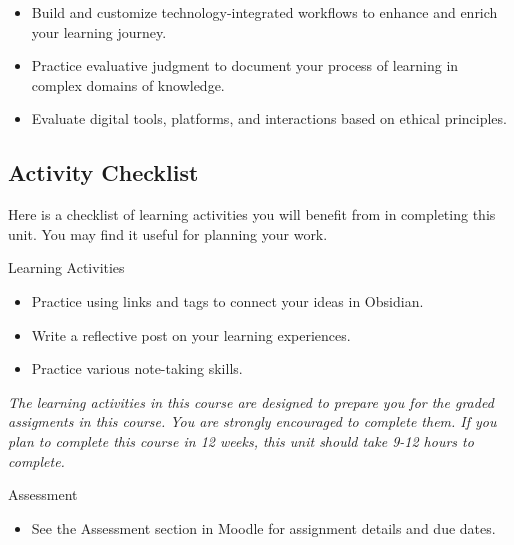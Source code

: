 \documentclass[
]{book}
\providecommand{\tightlist}{%
  \setlength{\itemsep}{0pt}\setlength{\parskip}{0pt}}
\theoremstyle{definition}
\theoremstyle{definition}
\theoremstyle{definition}
\theoremstyle{definition}
\theoremstyle{remark}
\begin{document}
\begin{itemize}
\tightlist
\item
  Build and customize technology-integrated workflows to enhance and enrich your learning journey.\\
\item
  Practice evaluative judgment to document your process of learning in complex domains of knowledge.\\
\item
  Evaluate digital tools, platforms, and interactions based on ethical principles.
\end{itemize}

\hypertarget{activity-checklist-2}{%
\subsection*{Activity Checklist}\label{activity-checklist-2}}

Here is a checklist of learning activities you will benefit from in completing this unit. You may find it useful for planning your work.

\begin{reflect}
{Learning Activities}

\begin{itemize}
\tightlist
\item
  Practice using links and tags to connect your ideas in Obsidian.\\
\item
  Write a reflective post on your learning experiences.
\item
  Practice various note-taking skills.
\end{itemize}

\emph{The learning activities in this course are designed to prepare you for the graded assigments in this course. You are strongly encouraged to complete them.
If you plan to complete this course in 12 weeks, this unit should take 9-12 hours to complete.}
\end{reflect}

\begin{assessment}
{Assessment}

\begin{itemize}
\tightlist
\item
  See the Assessment section in Moodle for assignment details and due dates.
\end{itemize}
\end{assessment}
\end{document}
